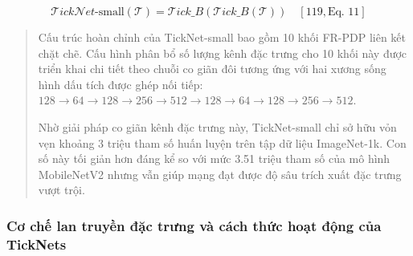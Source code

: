 \documentclass[
]{article}
\begin{document}
\[\mathcal{T}ick\mathcal{N}et\text{-small}\left( \mathcal{T} \right) = \mathcal{T}ick\_ B\left( \mathcal{T}ick\_ B\left( \mathcal{T} \right) \right)\quad\left\lbrack 119,\text{Eq.~11} \right\rbrack\]

\begin{quote}
Cấu trúc hoàn chỉnh của TickNet-small bao gồm 10 khối FR-PDP liên kết
chặt chẽ. Cấu hình phân bổ số lượng kênh đặc trưng cho 10 khối này được
triển khai chi tiết theo chuỗi co giãn đôi tương ứng với hai xương sống
hình dấu tích được ghép nối tiếp:
\(128 \rightarrow 64 \rightarrow 128 \rightarrow 256 \rightarrow 512 \rightarrow 128 \rightarrow 64 \rightarrow 128 \rightarrow 256 \rightarrow 512\).

Nhờ giải pháp co giãn kênh đặc trưng này, TickNet-small chỉ sở hữu vỏn
vẹn khoảng 3 triệu tham số huấn luyện trên tập dữ liệu ImageNet-1k. Con
số này tối giản hơn đáng kể so với mức 3.51 triệu tham số của mô hình
MobileNetV2 nhưng vẫn giúp mạng đạt được độ sâu trích xuất đặc trưng
vượt trội.
\end{quote}

\hypertarget{cux1a1-chux1ebf-lan-truyux1ec1n-ux111ux1eb7c-trux1b0ng-vuxe0-cuxe1ch-thux1ee9c-houx1ea1t-ux111ux1ed9ng-cux1ee7a-ticknets}{%
\subsubsection{Cơ chế lan truyền đặc trưng và cách thức hoạt động của
TickNets}\label{cux1a1-chux1ebf-lan-truyux1ec1n-ux111ux1eb7c-trux1b0ng-vuxe0-cuxe1ch-thux1ee9c-houx1ea1t-ux111ux1ed9ng-cux1ee7a-ticknets}}
\end{document}
